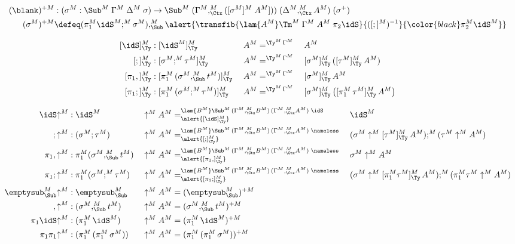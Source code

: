 \documentclass[a4paper,UKenglish,numberwithinsect,cleveref,thm-restate]{lipics-v2021}
\begin{document}
\begin{alignat*}{5}
  (\blank)^{+M} & : (\sigma^M : \Sub^M\;\Gamma^M\;\Delta^M\;\sigma) \to \Sub^M\;(\Gamma^M ,_{\Ctx}^M ([ \sigma^M ]^M\;A^M]))\;(\Delta^M ,_{\Ctx}^M A^M)\;(\sigma^+) \\
  (\sigma^M)^{+M} & \defeq (\pi_1^M \idS^M ;^M \sigma^M) ,_{\Sub}^M \alert{\transfib{\lam{A^M}\Tm^M\;\Gamma^M\;A^M\;\pi_2\idS}{([;]^M)^{-1}}{\color{black}\pi_2^M \idS^M}}
\end{alignat*}

\begin{alignat*}{5}
  [\idS]_{\Ty}^M      & : [ \idS^M ]^M_{\Ty}                             && \;A^M =^{\Ty^M\,\Gamma^M}\; && A^M \\
  [;]_{\Ty}^M         & : [ \sigma^M ;^M \tau^M ]^M_{\Ty}                && \;A^M =^{\Ty^M\,\Gamma^M}\; && [\sigma^M]^M_{\Ty}\,([\tau^M]^M_{\Ty}\,A^M) \\
  [\pi_1,]^M_{\Ty}    & : [ \pi_1^M\,(\sigma^M ,^M_{\Sub} t^M) ]^M_{\Ty} && \;A^M =^{\Ty^M\,\Gamma^M} \; && [\sigma^M]^M_{\Ty}\,A^M \\
  [\pi_1;]^M_{\Ty}    & : [ \pi_1^M\,(\sigma^M ;^M \tau^M) ]^M_{\Ty}     && \;A^M =^{\Ty^M\,\Gamma^M} \; && [\sigma^M]^M_{\Ty}\left([ \pi_1^M\,\tau^M]^M_{\Ty}\,A^M\right)
\end{alignat*}

\begin{alignat*}{5}
  \idS\mathord{\uparrow}^M      & : \idS^M              && \uparrow^M A^M  =^{\lam{B^M} \Sub^M\,(\Gamma^M ,_{\Ctx}^M B^M)\,(\Gamma^M ,_{\Ctx}^M A^M)\;\idS}_{\alert{[\idS]^M_{\Ty}}} {} && \idS^M \\
  ;\mathord{\uparrow}^M         & : (\sigma^M ; \tau^M) && \uparrow^M A^M  =^{\lam{B^M} \Sub^M\,(\Gamma^M ,_{\Ctx}^M B^M)\,(\Gamma^M ,_{\Ctx}^M A^M)\;\nameless}_{\alert{[;]^M_{\Ty}}} {} && (\sigma^M \uparrow^M [ \tau^M ]^M_{\Ty} \,A^M) ;^M (\tau^M \uparrow^M A^M)  \\
  \pi_1,\mathord{\uparrow}^M    & : \pi_1^M(\sigma^M ,^M_{\Sub} t^M) && \uparrow^M A^M  =^{\lam{B^M} \Sub^M\,(\Gamma^M ,_{\Ctx}^M B^M)\,(\Gamma^M ,_{\Ctx}^M A^M)\;\nameless}_{\alert{[\pi_1,]^M_{\Ty}}}            {} && \sigma^M \uparrow^M  A^M \\
  \pi_1;\mathord{\uparrow}^M    & : \pi_1^M(\sigma^M ;^M \tau^M)     && \uparrow^M A^M  =^{\lam{B^M} \Sub^M\,(\Gamma^M ,_{\Ctx}^M B^M)\,(\Gamma^M ,_{\Ctx}^M A^M)\;\nameless}_{\alert{[\pi_1;]^M_{\Ty}}} {} && (\sigma^M \uparrow^M  [\pi_1^M\tau^M]^M_{\Ty}\,A^M);^M (\pi_1^M\tau^M \uparrow^M A^M) \\
  \emptysub^M_{\Sub} \mathord{\uparrow}^M & : \emptysub^M_{\Sub} && \uparrow^M A^M = (\emptysub^M_{\Sub})^{+M} \\
  ,\mathord{\uparrow}^M & : (\sigma^M ,_{\Sub}^M t^M)  && \uparrow^M A^M = (\sigma^M ,_{\Sub}^M t^M)^{+M} \\
  \pi_1\idS\mathord{\uparrow}^M & : (\pi_1^M\,\idS^M) && \uparrow^M A^M = (\pi_1^M\,\idS^M)^{+M} \\
  \pi_1\pi_1\mathord{\uparrow}^M & : (\pi_1^M\,(\pi_1^M\,\sigma^M)) && \uparrow^M A^M = (\pi_1^M\,(\pi_1^M\,\sigma^M))^{+M}
\end{alignat*}
\end{document}
